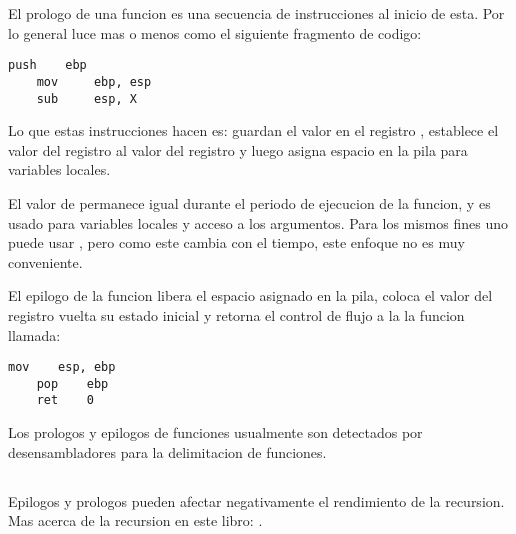\label{sec:prologepilog}
\myindex{\ESph{}} %
\myindex{\ESph{}} %

El prologo de una funcion es una secuencia de instrucciones al inicio de esta.
Por lo general luce mas o menos como el siguiente fragmento de codigo:

\begin{lstlisting}[style=customasmx86]
    push    ebp
    mov     ebp, esp
    sub     esp, X
\end{lstlisting}

Lo que estas instrucciones hacen es: guardan el valor en el registro \EBP, establece el valor del registro \EBP al valor del registro \ESP y luego asigna espacio en la pila para variables locales.

El valor de \EBP permanece igual durante el periodo de ejecucion de la funcion, y es usado para variables locales y acceso a los argumentos.
Para los mismos fines uno puede usar \ESP, pero como este cambia con el tiempo, este enfoque no es muy conveniente.

El epilogo de la funcion libera el espacio asignado en la pila, coloca el valor del registro \EBP vuelta su estado inicial y retorna el control de flujo a la la funcion llamada:

\begin{lstlisting}[style=customasmx86]
    mov    esp, ebp
    pop    ebp
    ret    0
\end{lstlisting}

Los prologos y epilogos de funciones usualmente son detectados por desensambladores para la delimitacion de funciones.

\subsection{\Recursion}
\myindex{\Recursion}

Epilogos y prologos pueden afectar negativamente el rendimiento de la recursion.
Mas acerca de la recursion en este libro: .

